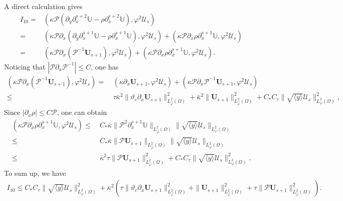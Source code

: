 \documentclass{amsart}
\numberwithin{equation}{section}
\newcommand\y{{{\langle y \rangle}}}
\begin{document}
A direct calculation gives
\begin{align*}
I_{10}
=& (\kappa\mathcal{P}(\partial_{y}\partial_{x}^{s+2}\mathbb{U}-\rho\partial_{x}^{s+2}\mathbb{U}),\varphi^{2}\mathcal{U}_{s})\\
=& (\kappa\mathcal{P}\partial_{x}(\partial_{y}\partial_{x}^{s+1}\mathbb{U}-\rho\partial_{x}^{s+1}\mathbb{U}),\varphi^{2}\mathcal{U}_{s})
  +(\kappa\mathcal{P}\partial_{x}\rho\partial_{x}^{s+1}\mathbb{U},\varphi^{2}\mathcal{U}_{s})\\
=& (\kappa\mathcal{P}\partial_{x}(\mathcal{P}^{-1}\mathbf{U}_{s+1}),\varphi^{2}\mathcal{U}_{s})
  +(\kappa\mathcal{P}\partial_{x}\rho\partial_{x}^{s+1}\mathbb{U},\varphi^{2}\mathcal{U}_{s}).
\end{align*}
Noticing that $|\mathcal{P}\partial_{x}\mathcal{P}^{-1}|\leq C$, one has
\begin{align*}
(\kappa\mathcal{P}\partial_{x}(\mathcal{P}^{-1}\mathbf{U}_{s+1}),\varphi^{2}\mathcal{U}_{s})
=&~(\kappa\partial_{x}\mathbf{U}_{s+1},\varphi^{2}\mathcal{U}_{s})
  +(\kappa\mathcal{P}\partial_{x}\mathcal{P}^{-1}\mathbf{U}_{s+1},\varphi^{2}\mathcal{U}_{s})\\
\leq&~\tau\bar{\kappa}^{2}\|\vartheta_{c}\partial_{x}\mathbf{U}_{s+1}\|_{L_{\hat{\varphi}}^{2}(\Omega)}^{2}
     +\bar{\kappa}^{2}\|\mathbf{U}_{s+1}\|_{L_{\hat{\varphi}}^{2}(\Omega)}^{2}
     +C_{*}C_{\tau}\|\sqrt{\y}\mathcal{U}_{s}\|_{L_{\varphi}^{2}(\Omega)}^{2},
\end{align*}
Since $|\partial_{x}\rho|\leq C\mathcal{P}$, one can obtain
\begin{align*}
(\kappa\mathcal{P}\partial_{x}\rho\partial_{x}^{s+1}\mathbb{U},\varphi^{2}\mathcal{U}_{s})
\leq&~C_{*}\bar{\kappa}\|\mathcal{P}^{2}\partial_{x}^{s+1}\mathbb{U}\|_{L_{\hat{\varphi}}^{2}(\Omega)}
                 \|\sqrt{\y}\mathcal{U}_{s}\|_{L_{\varphi}^{2}(\Omega)}\\
\leq&~C_{*}\bar{\kappa}\|\mathcal{P}\mathbf{U}_{s+1}\|_{L_{\hat{\varphi}}^{2}(\Omega)}\|\sqrt{\y}\mathcal{U}_{s}\|_{L_{\varphi}^{2}(\Omega)}\\
\leq&~\bar{\kappa}^{2}\tau\|\mathcal{P}\mathbf{U}_{s+1}\|_{L_{\hat{\varphi}}^{2}(\Omega)}^{2}
     +C_{*}C_{\tau}\|\sqrt{\y}\mathcal{U}_{s}\|_{L_{\varphi}^{2}(\Omega)}^{2}.
\end{align*}
To sum up, we have
\begin{align*}
I_{10}
\leq C_{*}C_{\tau}\|\sqrt{\y}\mathcal{U}_{s}\|_{L_{\varphi}^{2}(\Omega)}^{2}
    +\bar{\kappa}^{2}\left(\tau\|\vartheta_{c}\partial_{x}\mathbf{U}_{s+1}\|_{L_{\hat{\varphi}}^{2}(\Omega)}^{2}
               +\|\mathbf{U}_{s+1}\|_{L_{\hat{\varphi}}^{2}(\Omega)}^{2}
               +\tau\|\mathcal{P}\mathbf{U}_{s+1}\|_{L_{\hat{\varphi}}^{2}(\Omega)}^{2}\right).
\end{align*}
\end{document}
